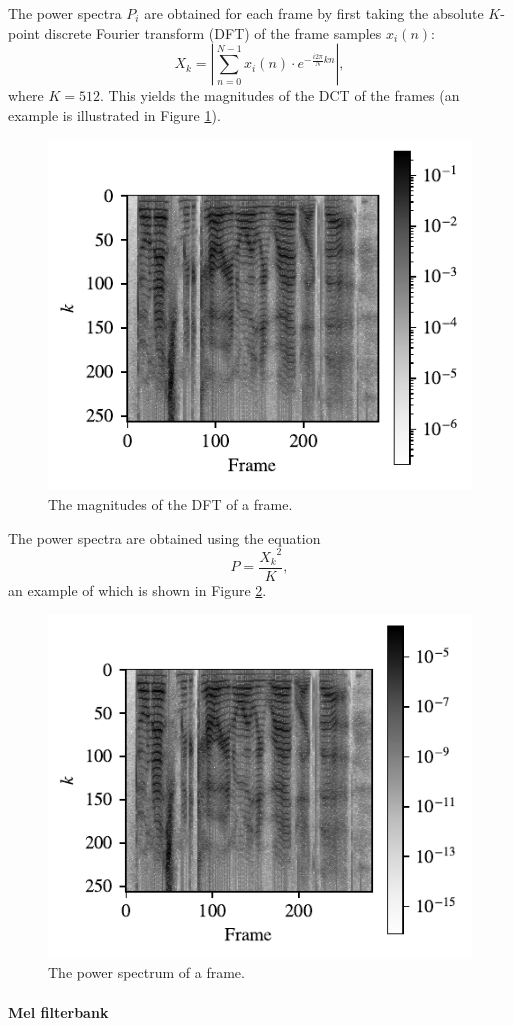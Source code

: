 			The power spectra $P_i$ are obtained for each frame by first taking the absolute $K$-point discrete Fourier transform (DFT) of the frame samples $x_i(n)$:
			\begin{equation}
				X_k = \left|\sum_{n=0}^{N-1}x_i(n)\cdot e^{-\frac{i2\pi}{N}kn}\right|,
			\end{equation}
			where $K=512$.
			This yields the magnitudes of the DCT of the frames (an example is illustrated in Figure \ref{fig:magframes}).
			\begin{figure}[ht]
				\centering
			    \includegraphics[width=0.45\linewidth]{gfx/magframes}
			    \caption{The magnitudes of the DFT of a frame.}
			    \label{fig:magframes}
			\end{figure}

			The power spectra are obtained using the equation
			\begin{equation}\label{eq:powframes}
				P = \frac{{X_k}^2}{K},
			\end{equation}
			an example of which is shown in Figure \ref{fig:powframes}.

			\begin{figure}[ht]
				\centering
			    \includegraphics[width=0.45\linewidth]{gfx/powframes}
			    \caption{The power spectrum of a frame.}
			    \label{fig:powframes}
			\end{figure}

		\paragraph{Mel filterbank}

